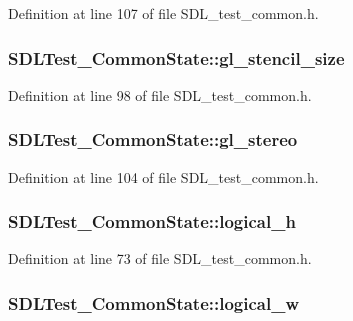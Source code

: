 Definition at line 107 of file S\-D\-L\-\_\-test\-\_\-common.\-h.

\hypertarget{struct_s_d_l_test___common_state_af27830ef5d5ed9cc8e90088a69f4d78f}{
\subsubsection[{gl\-\_\-stencil\-\_\-size}]{ S\-D\-L\-Test\-\_\-\-Common\-State\-::gl\-\_\-stencil\-\_\-size}}\label{struct_s_d_l_test___common_state_af27830ef5d5ed9cc8e90088a69f4d78f}


Definition at line 98 of file S\-D\-L\-\_\-test\-\_\-common.\-h.

\hypertarget{struct_s_d_l_test___common_state_a39177b165c6a9c2164937c82402e2d4f}{
\subsubsection[{gl\-\_\-stereo}]{ S\-D\-L\-Test\-\_\-\-Common\-State\-::gl\-\_\-stereo}}\label{struct_s_d_l_test___common_state_a39177b165c6a9c2164937c82402e2d4f}


Definition at line 104 of file S\-D\-L\-\_\-test\-\_\-common.\-h.

\hypertarget{struct_s_d_l_test___common_state_af2ba89b260406782607ad1dd22676a5b}{
\subsubsection[{logical\-\_\-h}]{ S\-D\-L\-Test\-\_\-\-Common\-State\-::logical\-\_\-h}}\label{struct_s_d_l_test___common_state_af2ba89b260406782607ad1dd22676a5b}


Definition at line 73 of file S\-D\-L\-\_\-test\-\_\-common.\-h.

\hypertarget{struct_s_d_l_test___common_state_a8a90266f8d6dc7846fbd3368426caec1}{
\subsubsection[{logical\-\_\-w}]{ S\-D\-L\-Test\-\_\-\-Common\-State\-::logical\-\_\-w}}\label{struct_s_d_l_test___common_state_a8a90266f8d6dc7846fbd3368426caec1}


